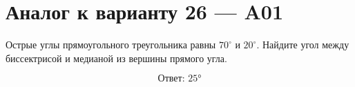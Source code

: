 


\section*{Аналог к варианту 26 — A01}
Острые углы прямоугольного треугольника равны \(70^\circ\) и \(20^\circ\). Найдите угол между биссектрисой и медианой из вершины прямого угла.
\begin{center}\figRightBisectorMedian\end{center}
\[\boxed{\text{Ответ: }25°}\]

